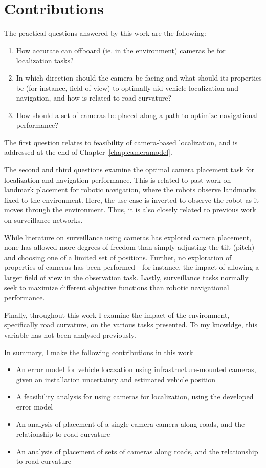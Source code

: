 \documentclass[a4paper,12pt,twoside,openright]{report}
\begin{document}
\section{Contributions}

The practical questions answered by this work are the following:
\begin{enumerate}
    \item How accurate can offboard (ie. in the environment) cameras be for localization tasks?
    \item In which direction should the camera be facing and what should its properties be (for instance, field of view)
          to optimally aid vehicle localization and navigation, and how is related to road curvature?
    \item How should a set of cameras be placed along a path to optimize navigational performance?
\end{enumerate}

The first question relates to feasibility of camera-based localization,
and is addressed at the end of Chapter~\ref{chap:cameramodel}.

The second and third questions examine the optimal camera placement task 
for localization and navigation performance. This is related to past work 
on landmark placement for robotic navigation, where the robots observe landmarks fixed to the environment. 
Here, the use case is inverted to observe the robot as it moves through the environment. 
Thus, it is also closely related to previous work on surveillance networks.

While literature on surveillance using cameras has explored camera placement, none 
has allowed more degrees of freedom than simply adjusting the tilt (pitch) 
and choosing one of a limited set of positions. Further, no exploration of 
properties of cameras has been performed - for instance, the impact
of allowing a larger field of view in the observation task. Lastly, surveillance
tasks normally seek to maximize different objective functions than robotic
navigational performance.

Finally, throughout this work I examine the impact of the environment, specifically
road curvature, on the various tasks presented. To my knowldge, this variable has not been
analysed previously.

In summary, I make the following contributions in this work
\begin{itemize}
    \item An error model for vehicle locazation using infrastructure-mounted cameras, given an installation uncertainty and estimated vehicle position
    \item A feasibility analysis for using cameras for localization, using the developed error model
    \item An analysis of placement of a single camera camera along roads, and the relationship to road curvature
    \item An analysis of placement of sets of cameras along roads, and the relationship to road curvature
\end{itemize}
\end{document}
